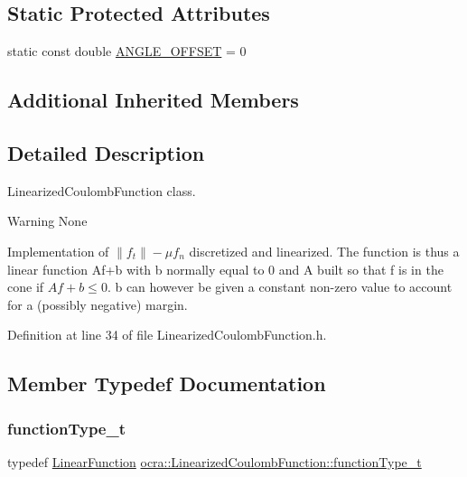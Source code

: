 \subsection*{Static Protected Attributes}
\begin{DoxyCompactItemize}
\item 
static const double \hyperlink{classocra_1_1LinearizedCoulombFunction_a1778e1ecca6c7d54f846a750f9a06552}{A\+N\+G\+L\+E\+\_\+\+O\+F\+F\+S\+ET} = 0
\end{DoxyCompactItemize}
\subsection*{Additional Inherited Members}


\subsection{Detailed Description}
Linearized\+Coulomb\+Function class. 

\begin{DoxyWarning}{Warning}
None
\end{DoxyWarning}
Implementation of $ \left\|f_t\right\| - \mu f_n $ discretized and linearized. The function is thus a linear function Af+b with b normally equal to 0 and A built so that f is in the cone if $ Af+b \le 0 $. b can however be given a constant non-\/zero value to account for a (possibly negative) margin. 

Definition at line 34 of file Linearized\+Coulomb\+Function.\+h.



\subsection{Member Typedef Documentation}
\hypertarget{classocra_1_1LinearizedCoulombFunction_a3b8f1d487a59ea860aee65223cc7c6aa}{}\label{classocra_1_1LinearizedCoulombFunction_a3b8f1d487a59ea860aee65223cc7c6aa} 
\subsubsection{\texorpdfstring{function\+Type\+\_\+t}{functionType\_t}}
{\footnotesize\ttfamily typedef \hyperlink{classocra_1_1LinearFunction}{Linear\+Function} \hyperlink{classocra_1_1LinearizedCoulombFunction_a3b8f1d487a59ea860aee65223cc7c6aa}{ocra\+::\+Linearized\+Coulomb\+Function\+::function\+Type\+\_\+t}}



